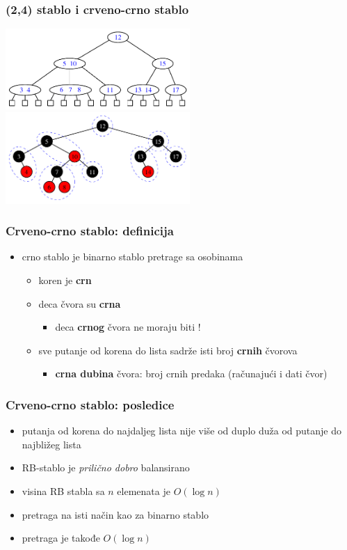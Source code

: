 \documentclass[compress,aspectratio=169]{beamer}
\begin{document}
\begin{frame}[fragile]
  \frametitle{(2,4) stablo i crveno-crno stablo}
  \begin{center}
    \includegraphics[width=7cm]{asp-11-pic30.pdf} \\
    \includegraphics[width=7cm]{asp-11-pic38.pdf}
  \end{center}
\end{frame}

\begin{frame}[fragile]
  \frametitle{Crveno-crno stablo: definicija}
  \begin{itemize}
    \item {}crno stablo je binarno stablo pretrage sa osobinama
    \begin{itemize}
      \item koren je \textbf{crn}
      \item deca \textbf{} čvora su \textbf{crna}
      \begin{itemize}
        \item deca \textbf{crnog} čvora ne moraju biti \textbf{}!
      \end{itemize}
      \item sve putanje od korena do lista sadrže isti broj \textbf{crnih} čvorova
      \begin{itemize}
        \item \textbf{crna dubina} čvora: broj crnih predaka (računajući i dati čvor)
      \end{itemize}
    \end{itemize}
  \end{itemize}
\end{frame}

\begin{frame}[fragile]
  \frametitle{Crveno-crno stablo: posledice}
  \begin{itemize}
    \item putanja od korena do najdaljeg lista nije više od duplo duža od putanje do najbližeg lista
    \item RB-stablo je \textit{prilično dobro} balansirano
    \item visina RB stabla sa $n$ elemenata je $O(\log n)$
    \item pretraga na isti način kao za binarno stablo
    \item pretraga je takođe $O(\log n)$
  \end{itemize}
\end{frame}
\end{document}
